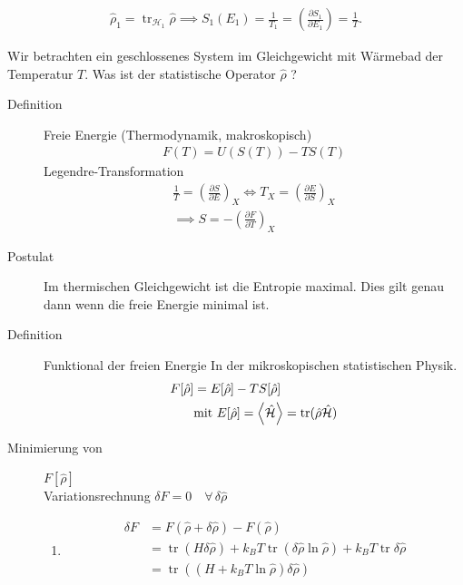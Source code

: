 \documentclass[11pt]{article}
\theoremstyle{plain}
\theoremstyle{mytheoremstyle}
\newcommand{\pd}[2]{\frac{\partial #1 }{\partial #2}}
\newcommand{\trace}{\operatorname{tr}}
\begin{document}
%

%
\begin{align*}
  \hat{\rho}_1 = \trace_{\mathcal{H}_1} \hat{\rho} \implies S_1 (E_1) = 
  \frac{1}{T_1} = \left( \pd{S_1}{E_1} \right) = \frac{1}{T} .
\end{align*}
%

Wir betrachten ein geschlossenes System im Gleichgewicht mit W\"armebad der 
Temperatur $T$. Was ist der statistische Operator $\hat{\rho}$ ?

\begin{description}
  \item[Definition]  Freie Energie (Thermodynamik, makroskopisch)
    \begin{align*}
      F(T) = U(S(T)) - T S(T)
    \end{align*}
    Legendre-Transformation
    \begin{align*}
      \frac{1}{T} = \left( \pd{S}{E} \right)_X \iff T_X =
      \left( \pd{E}{S} \right)_X \\
      \implies S = - \left( \pd{F}{T} \right)_X
    \end{align*}
  \item[Postulat] Im thermischen Gleichgewicht ist die Entropie maximal. 
    Dies gilt genau dann wenn die freie Energie minimal ist.
  \item[Definition] Funktional der freien Energie In der 
    mikroskopischen statistischen Physik.
    \begin{align*}
      F[\hat{\rho}] & = E[\hat{\rho}] - T S [\hat{\rho}] \\
                    & \text{mit } E [\hat{\rho}] = \Braket{\hat{ \mathcal{H}}}
      = \trace (\hat{\rho} \hat{ \mathcal{H}})
    \end{align*}
  \item[Minimierung von ] $F[\hat{\rho}]$ \\
    Variationsrechnung $\delta F= 0 \quad\forall\, \delta \hat{\rho}$
    \begin{enumerate}
      \item %
      \begin{align*}
          \delta F & = F \left( \hat{\rho} + \delta \hat{ \rho} \right) -
          F \left( \hat{\rho} \right) \\ & = \trace (H \delta \hat{\rho}) 
        + k_B T \trace (\delta \hat{\rho} \ln{\hat{\rho}}) + k_B T \trace
        \delta \hat{\rho} \\ & = \trace ( ( H+ k_B T \ln{ \hat{\rho}}) \delta \hat{\rho}) \\

\end{align*}
\end{enumerate}
\end{description}
\end{document}
